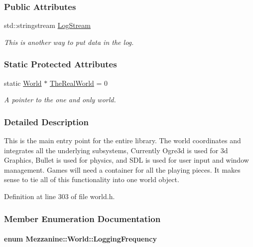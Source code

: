 \subsubsection*{Public Attributes}
\begin{DoxyCompactItemize}
\item 
std::stringstream \hyperlink{classMezzanine_1_1World_a32b1c4de1bbf5495452e463802ffa499}{LogStream}
\begin{DoxyCompactList}\small\item\em This is another way to put data in the log. \item\end{DoxyCompactList}\end{DoxyCompactItemize}
\subsubsection*{Static Protected Attributes}
\begin{DoxyCompactItemize}
\item 
\hypertarget{classMezzanine_1_1World_a86c5d362a144d6cad245fd022f512b21}{
static \hyperlink{classMezzanine_1_1World}{World} $\ast$ \hyperlink{classMezzanine_1_1World_a86c5d362a144d6cad245fd022f512b21}{TheRealWorld} = 0}
\label{classMezzanine_1_1World_a86c5d362a144d6cad245fd022f512b21}

\begin{DoxyCompactList}\small\item\em A pointer to the one and only world. \item\end{DoxyCompactList}\end{DoxyCompactItemize}


\subsubsection{Detailed Description}
This is the main entry point for the entire library. The world coordinates and integrates all the underlying subsystems, Currently Ogre3d is used for 3d Graphics, Bullet is used for physics, and SDL is used for user input and window management. Games will need a container for all the playing pieces. It makes sense to tie all of this functionality into one world object. 

Definition at line 303 of file world.h.



\subsubsection{Member Enumeration Documentation}
\hypertarget{classMezzanine_1_1World_a535c832832bbdebcdc623c3472a32e25}{
\paragraph[{LoggingFrequency}]{\setlength{\rightskip}{0pt plus 5cm}enum {\bf Mezzanine::World::LoggingFrequency}}\hfill}
\label{classMezzanine_1_1World_a535c832832bbdebcdc623c3472a32e25}


